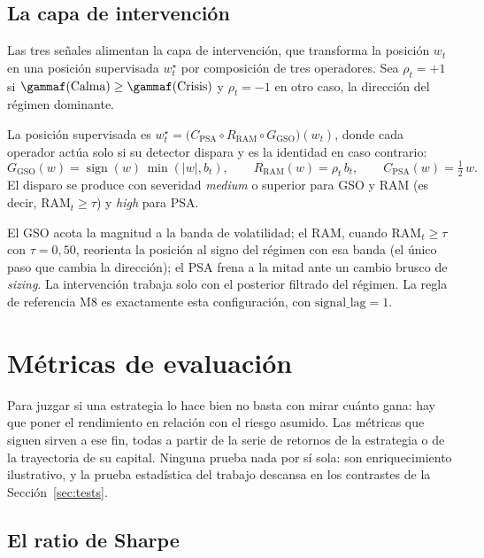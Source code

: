 \subsection{La capa de intervención}
\label{sec:strata-intervencion}

Las tres señales alimentan la capa de intervención, que transforma la posición $w_t$ en una posición supervisada $w_t^{\star}$ por composición de tres operadores. Sea $\rho_t = +1$ si $\gammaf(\text{Calma}) \ge \gammaf(\text{Crisis})$ y $\rho_t = -1$ en otro caso, la dirección del régimen dominante.

\begin{definicion}
\label{def:m8}
La posición supervisada es $w_t^{\star} = \big(C_{\mathrm{PSA}} \circ R_{\mathrm{RAM}} \circ G_{\mathrm{GSO}}\big)(w_t)$, donde cada operador actúa solo si su detector dispara y es la identidad en caso contrario:
\[
G_{\mathrm{GSO}}(w) = \operatorname{sign}(w)\,\min(|w|, b_t),
\qquad
R_{\mathrm{RAM}}(w) = \rho_t\, b_t,
\qquad
C_{\mathrm{PSA}}(w) = \tfrac{1}{2}\, w.
\]
El disparo se produce con severidad \emph{medium} o superior para GSO y RAM (es decir, $\mathrm{RAM}_t \ge \tau$) y \emph{high} para PSA.
\end{definicion}

El GSO acota la magnitud a la banda de volatilidad; el RAM, cuando $\mathrm{RAM}_t \ge \tau$ con $\tau = 0{,}50$, reorienta la posición al signo del régimen con esa banda (el único paso que cambia la dirección); el PSA frena a la mitad ante un cambio brusco de \emph{sizing}. La intervención trabaja solo con el posterior filtrado del régimen. La regla de referencia M8 es exactamente esta configuración, con $\mathrm{signal\_lag} = 1$.

\section{Métricas de evaluación}
\label{sec:metricas}

Para juzgar si una estrategia lo hace bien no basta con mirar cuánto gana: hay que poner el rendimiento en relación con el riesgo asumido. Las métricas que siguen sirven a ese fin, todas a partir de la serie de retornos de la estrategia o de la trayectoria de su capital. Ninguna prueba nada por sí sola: son enriquecimiento ilustrativo, y la prueba estadística del trabajo descansa en los contrastes de la Sección~\ref{sec:tests}.

\subsection{El ratio de Sharpe}
\label{sec:economia-sharpe}

